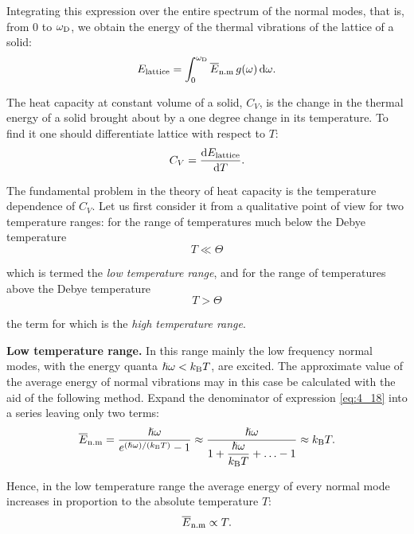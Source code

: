 \noindent
Integrating this expression over the entire spectrum of the normal modes, that is, from $0$ to $\omega_{\text{D}}$, we obtain the energy of the thermal vibrations of the lattice of a solid:
\vspace{-12pt}
\begin{equation}\label{eq:4_19}
    E_{\text{lattice}} = \int_0^{\omega_{\text{D}}} \overline{E}_{\text{n.m}}\, g(\omega)\, \mathrm{d}\omega.
\end{equation}

The heat capacity at constant volume of a solid, $C_V$, is the change in the thermal energy of a solid brought about by a one degree change in its temperature. To find it one should differentiate lattice with respect to $T$:
\begin{equation}\label{eq:4_20}
    C_V = \dfrac{\mathrm{d}E_{\text{lattice}}}{\mathrm{d} T}.
\end{equation}

The fundamental problem in the theory of heat capacity is the temperature dependence of $C_V$. Let us first consider it from a qualitative point of view for two temperature ranges: for the range of temperatures much below the Debye temperature
\begin{equation}\label{eq:4_21}
    T \ll \Theta
\end{equation}

\noindent
which is termed the \textit{low temperature range}, and for the range of temperatures above the Debye temperature
\begin{equation}\label{eq:4_22}
    T > \Theta
\end{equation}

\noindent
the term for which is the \textit{high temperature range}.

\textbf{Low temperature range.} In this range mainly the low frequency normal modes, with the energy quanta $\hslash\omega<k_{\text{B}}T$, are excited. The approximate value of the average energy of normal vibrations may in this case be calculated with the aid of the following method. Expand the denominator of expression \eqref{eq:4_18} into a series leaving only two terms:
\begin{equation*}
    \overline{E}_{\text{n.m}} = \frac{\hslash\omega}{e^{(\hslash\omega)/(k_{\text{B}}T)} - 1} \approx \frac{\hslash\omega}{1 + \dfrac{\hslash\omega}{k_{\text{B}}T} + \ldots - 1} \approx k_{\text{B}}T.
\end{equation*}

\noindent
Hence, in the low temperature range the average energy of every normal mode increases in proportion to the absolute temperature $T$:
\begin{equation}\label{eq:4_23}
    \overline{E}_{\text{n.m}} \propto T.
\end{equation}

